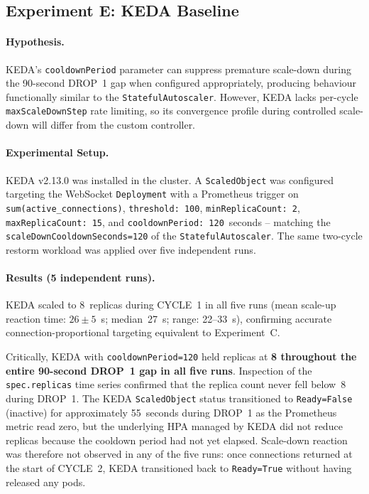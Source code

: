 \documentclass[twocolumn]{svjour3}
\begin{document}
\subsection{Experiment E: KEDA Baseline}
\label{sec:experiment_e}

\paragraph{Hypothesis.}  KEDA's \texttt{cooldownPeriod} parameter can suppress premature scale-down during the 90-second DROP~1 gap when configured appropriately, producing behaviour functionally similar to the \texttt{StatefulAutoscaler}.  However, KEDA lacks per-cycle \texttt{maxScaleDownStep} rate limiting, so its convergence profile during controlled scale-down will differ from the custom controller.

\paragraph{Experimental Setup.}  KEDA v2.13.0 was installed in the cluster.  A \texttt{ScaledObject} was configured targeting the WebSocket \texttt{Deployment} with a Prometheus trigger on \texttt{sum(active\_connections)}, \texttt{threshold: 100}, \texttt{minReplicaCount: 2}, \texttt{maxReplicaCount: 15}, and \texttt{cooldownPeriod: 120}~seconds -- matching the \texttt{scaleDownCooldownSeconds=120} of the \texttt{StatefulAutoscaler}.  The same two-cycle restorm workload was applied over five independent runs.

\paragraph{Results (5 independent runs).}
KEDA scaled to 8~replicas during CYCLE~1 in all five runs (mean scale-up reaction time: $26 \pm 5$~s; median~27~s; range: 22--33~s), confirming accurate connection-proportional targeting equivalent to Experiment~C.

Critically, KEDA with \texttt{cooldownPeriod=120} held replicas at \textbf{8 throughout the entire 90-second DROP~1 gap in all five runs}.  Inspection of the \texttt{spec.replicas} time series confirmed that the replica count never fell below~8 during DROP~1.  The KEDA \texttt{ScaledObject} status transitioned to \texttt{Ready=False} (inactive) for approximately 55~seconds during DROP~1 as the Prometheus metric read zero, but the underlying HPA managed by KEDA did not reduce replicas because the cooldown period had not yet elapsed.  Scale-down reaction was therefore not observed in any of the five runs: once connections returned at the start of CYCLE~2, KEDA transitioned back to \texttt{Ready=True} without having released any pods.
\end{document}
